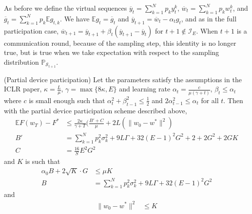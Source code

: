 As before we define the virtual sequences $\overline{y}_{t}=\sum_{k=1}^{N}p_{k}y_{t}^{k}$,
$\overline{w}_{t}=\sum_{k=1}^{N}p_{k}w_{t}^{k}$, and $\overline{g}_{t}=\sum_{k=1}^{N}p_{k}\mathbb{E}g_{t,k}$.
We have $\mathbb{E}g_{t}=\overline{g}_{t}$ and $\overline{y}_{t+1}=\overline{w}_{t}-\alpha_{t}g_{t}$,
and as in the full participation case, $\overline{w}_{t+1}=\overline{y}_{t+1}+\beta_{t}(\overline{y}_{t+1}-\overline{y}_{t})$
for $t+1\notin\mathcal{I}_{E}$. When $t+1$ is a communication round,
because of the sampling step, this identity is no longer true, but
is true when we take expectation with respect to the sampling distribution
$\mathbb{P}_{\mathcal{S}_{t+1}}$. 
\begin{thm}
	(Partial device participation) Let the parameters satisfy the assumptions
	in the ICLR paper, $\kappa=\frac{L}{\mu}$, $\gamma=\max\{8\kappa,E\}$
	and learning rate $\alpha_{t}=\frac{c}{\mu(\gamma+t)}$, $\beta_{t}\leq\alpha_{t}$
	where $c$ is small enough such that $\alpha_{t}^{2}+\beta_{t-1}^{2}\leq\frac{1}{2}$
	and $2\alpha_{t-1}^{2}\leq\alpha_{t}$ for all $t$. Then with the
	partial device participation scheme described above,
	\begin{align*}
	\mathbb{E}F(w_{T})-F^{\ast} & \leq\frac{2\kappa}{\gamma+T}(\frac{B'+C}{\mu}+2L(\|w_{0}-w^{\ast}\|^{2})\\
	B' & =\sum_{k=1}^{N}p_{k}^{2}\sigma_{k}^{2}+9L\Gamma+32(E-1)^{2}G^{2}+2+2G^{2}+2GK\\
	C & =\frac{16}{S}E^{2}G^{2}
	\end{align*}
	and $K$ is such that 
	\begin{align*}
	\alpha_{0}B+2\sqrt{K}\cdot G & \leq\mu K\\
	B & =\sum_{k=1}^{N}p_{k}^{2}\sigma_{k}^{2}+9L\Gamma+32(E-1)^{2}G^{2}
	\end{align*}
	and
	\begin{align*}
	\|w_{0}-w^{\ast}\|^{2} & \leq K
	\end{align*}
\end{thm}
%
